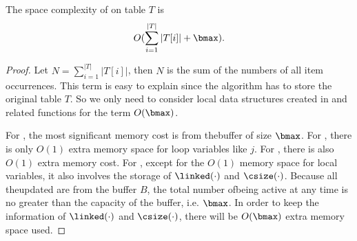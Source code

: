 \begin{theorem}
  The space complexity of \PartialSuppressor on table $T$ is \[ O(\sum_{i=1}^{|T|} |T[i]| + \bmax) .\]
\end{theorem}
\begin{proof}
Let $N = \sum_{i=1}^{|T|} |T[i]|$, then $N$ is the sum of the numbers 
of all item occurrences.
This term is easy to explain since the algorithm has to store 
the original table $T$.
So we only need to consider local data structures 
created in \PartialSuppressor
and related functions for the term $O(\bmax)$.

For \PartialSuppressor, the most significant memory cost is from the\qid buffer of size $\bmax$.
For \HandleShortRecords, there is only $O(1)$ extra memory space for loop variables like $j$.
For \HandleLongRecord, there is also $O(1)$ extra memory cost.
For \SanitizeBuffer, except for the $O(1)$ memory space for local variables, it also involves
  the storage of $\linked(\cdot)$ and $\csize(\cdot)$.
Because all the\qids updated are from the buffer $B$, the total number of\qids being active at any time
  is no greater than the capacity of the buffer, i.e. $\bmax$.
In order to keep the information of $\linked(\cdot)$ and $\csize(\cdot)$,
  there will be $O(\bmax)$ extra memory space used.
\end{proof}

%
%


